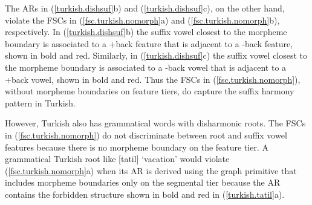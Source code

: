 \documentclass[,doc,floatsintext]{apa6}
\theoremstyle{definition}
\theoremstyle{definition}
\theoremstyle{definition}
\theoremstyle{remark}
\begin{document}
\noindent The ARs in (\ref{turkish.dishsuf}b) and
(\ref{turkish.dishsuf}c), on the other hand, violate the FSCs in
(\ref{fsc.turkish.nomorph}a) and (\ref{fsc.turkish.nomorph}b),
respectively. In (\ref{turkish.dishsuf}b) the suffix vowel closest to
the morpheme boundary is associated to a +back feature that is adjacent
to a -back feature, shown in bold and red. Similarly, in
(\ref{turkish.dishsuf}c) the suffix vowel closest to the morpheme
boundary is associated to a -back vowel that is adjacent to a +back
vowel, shown in bold and red. Thus the FSCs in
(\ref{fsc.turkish.nomorph}), without morpheme boundaries on feature
tiers, do capture the suffix harmony pattern in Turkish.

However, Turkish also has grammatical words with disharmonic roots. The
FSCs in (\ref{fsc.turkish.nomorph}) do not discriminate between root and
suffix vowel features because there is no morpheme boundary on the
feature tier. A grammatical Turkish root like {[}tatil{]} `vacation'
would violate (\ref{fsc.turkish.nomorph}a) when its AR is derived using
the graph primitive that includes morpheme boundaries only on the
segmental tier because the AR contains the forbidden structure shown in
bold and red in (\ref{turkish.tatil}a).

\begin{exe}
 \label{turkish.tatil} \\
\end{exe}
\end{document}
